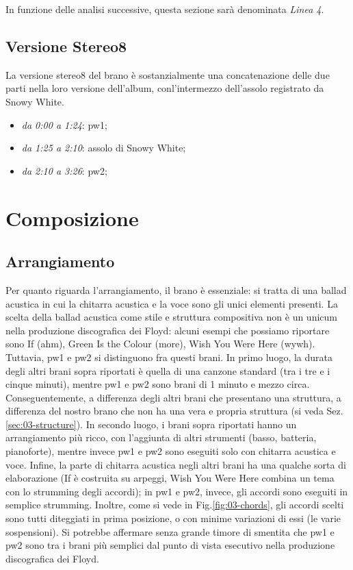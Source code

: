 \documentclass[class=book, crop=false, oneside, 12pt]{standalone}
\begin{document}
    In funzione delle analisi successive, questa sezione sarà denominata \emph{Linea 4}.

    \subsection{Versione Stereo8}
    La versione stereo8 del brano è sostanzialmente una concatenazione delle due parti nella loro versione dell'album, conl'intermezzo dell'assolo registrato da Snowy White. 

    \begin{itemize}
        \item \emph{da 0:00 a 1:24}: \acrlong{pw1};
        \item \emph{da 1:25 a 2:10}: assolo di Snowy White;
        \item \emph{da 2:10 a 3:26}: \acrlong{pw2};
    \end{itemize}

    \section{Composizione}
    \label{sec:03-arrangement}

    \subsection{Arrangiamento}
    Per quanto riguarda l'arrangiamento, il brano è essenziale: si tratta di una ballad acustica in cui la chitarra acustica e la voce sono gli unici elementi presenti. La scelta della ballad acustica come stile e struttura compositiva non è un unicum nella produzione discografica dei Floyd: alcuni esempi che possiamo riportare sono If (\acrshort{ahm}), Green Is the Colour (\acrshort{more}), Wish You Were Here (\acrshort{wywh}). Tuttavia, \acrshort{pw1} e \acrshort{pw2} si distinguono fra questi brani. In primo luogo, la durata degli altri brani sopra riportati è quella di una canzone standard (tra i tre e i cinque minuti), mentre \acrshort{pw1} e \acrshort{pw2} sono brani di 1 minuto e mezzo circa. Conseguentemente, a differenza  degli altri brani che presentano una struttura, a differenza del nostro brano che non ha una vera e propria struttura (si veda Sez.\ref{sec:03-structure}). In secondo luogo, i brani sopra riportati hanno un arrangiamento più ricco, con l'aggiunta di altri strumenti (basso, batteria, pianoforte), mentre invece \acrshort{pw1} e \acrshort{pw2} sono eseguiti solo con chitarra acustica e voce. Infine, la parte di chitarra acustica negli altri brani ha una qualche sorta di elaborazione (If è costruita su arpeggi, Wish You Were Here combina un tema con lo strumming degli accordi); in \acrshort{pw1} e \acrshort{pw2}, invece, gli accordi sono eseguiti in semplice strumming. Inoltre, come si vede in Fig.\ref{fig:03-chords}, gli accordi scelti sono tutti diteggiati in prima posizione, o con minime variazioni di essi (le varie sospensioni). Si potrebbe affermare senza grande timore di smentita che \acrshort{pw1} e \acrshort{pw2} sono tra i brani più semplici dal punto di vista esecutivo nella produzione discografica dei Floyd.
    
\end{document}
